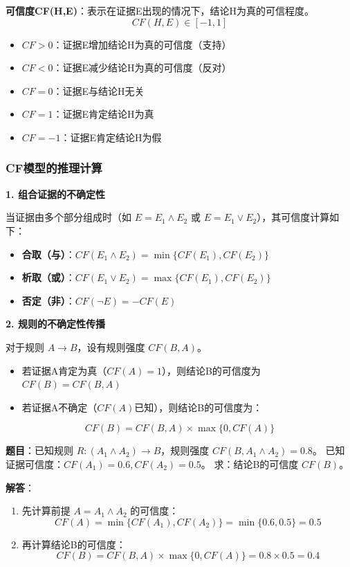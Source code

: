 \begin{formulabox}
\textbf{可信度CF(H,E)}：表示在证据E出现的情况下，结论H为真的可信程度。
$$CF(H,E) \in [-1, 1]$$
\begin{itemize}[itemsep=0pt]
    \item $CF > 0$：证据E增加结论H为真的可信度（支持）
    \item $CF < 0$：证据E减少结论H为真的可信度（反对）
    \item $CF = 0$：证据E与结论H无关
    \item $CF = 1$：证据E肯定结论H为真
    \item $CF = -1$：证据E肯定结论H为假
\end{itemize}
\end{formulabox}

\subsubsection{CF模型的推理计算}

\textbf{1. 组合证据的不确定性}

当证据由多个部分组成时（如 $E = E_1 \land E_2$ 或 $E = E_1 \lor E_2$），其可信度计算如下：
\begin{itemize}[itemsep=0pt]
    \item \textbf{合取（与）}：$CF(E_1 \land E_2) = \min\{CF(E_1), CF(E_2)\}$
    \item \textbf{析取（或）}：$CF(E_1 \lor E_2) = \max\{CF(E_1), CF(E_2)\}$
    \item \textbf{否定（非）}：$CF(\neg E) = -CF(E)$
\end{itemize}

\textbf{2. 规则的不确定性传播}

对于规则 $A \to B$，设有规则强度 $CF(B, A)$。
\begin{itemize}[itemsep=0pt]
    \item 若证据A肯定为真（$CF(A)=1$），则结论B的可信度为 $CF(B) = CF(B, A)$
    \item 若证据A不确定（$CF(A)$已知），则结论B的可信度为：
\end{itemize}
\begin{equation*}
CF(B) = CF(B, A) \times \max\{0, CF(A)\}
\end{equation*}

\begin{examplebox}[例题3.19 CF计算]
\textbf{题目}：已知规则 $R: (A_1 \land A_2) \to B$，规则强度 $CF(B, A_1 \land A_2) = 0.8$。
已知证据可信度：$CF(A_1) = 0.6, CF(A_2) = 0.5$。
求：结论B的可信度 $CF(B)$。

\tcblower
\textbf{解答}：
\begin{enumerate}[itemsep=0pt]
    \item 先计算前提 $A = A_1 \land A_2$ 的可信度：
    $$CF(A) = \min\{CF(A_1), CF(A_2)\} = \min\{0.6, 0.5\} = 0.5$$
    \item 再计算结论B的可信度：
    $$CF(B) = CF(B, A) \times \max\{0, CF(A)\} = 0.8 \times 0.5 = 0.4$$
\end{enumerate}
\end{examplebox}

